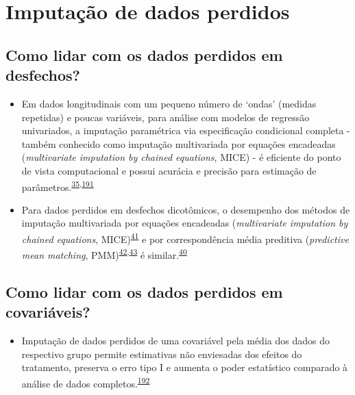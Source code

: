 \documentclass[
  a4paper,
]{book}
\providecommand{\tightlist}{%
  \setlength{\itemsep}{0pt}\setlength{\parskip}{0pt}}
\begin{document}
\hypertarget{imputacao-dados}{%
\section{Imputação de dados perdidos}\label{imputacao-dados}}

\hypertarget{como-lidar-com-os-dados-perdidos-em-desfechos}{%
\subsection{Como lidar com os dados perdidos em desfechos?}\label{como-lidar-com-os-dados-perdidos-em-desfechos}}

\begin{itemize}
\item
  Em dados longitudinais com um pequeno número de `ondas' (medidas repetidas) e poucas variáveis, para análise com modelos de regressão univariados, a imputação paramétrica via especificação condicional completa - também conhecido como imputação multivariada por equações encadeadas (\emph{multivariate imputation by chained equations}, MICE) - é eficiente do ponto de vista computacional e possui acurácia e precisão para estimação de parâmetros.\textsuperscript{\protect\hyperlink{ref-Heymans2022}{35},\protect\hyperlink{ref-Cao2022}{191}}
\item
  Para dados perdidos em desfechos dicotômicos, o desempenho dos métodos de imputação multivariada por equações encadeadas (\emph{multivariate imputation by chained equations}, MICE)\textsuperscript{\protect\hyperlink{ref-mice}{41}} e por correspondência média preditiva (\emph{predictive mean matching}, PMM)\textsuperscript{\protect\hyperlink{ref-rubin1986}{42},\protect\hyperlink{ref-little1988a}{43}} é similar.\textsuperscript{\protect\hyperlink{ref-austin2023}{40}}
\end{itemize}

\hypertarget{como-lidar-com-os-dados-perdidos-em-covariuxe1veis}{%
\subsection{Como lidar com os dados perdidos em covariáveis?}\label{como-lidar-com-os-dados-perdidos-em-covariuxe1veis}}

\begin{itemize}
\tightlist
\item
  Imputação de dados perdidos de uma covariável pela média dos dados do respectivo grupo permite estimativas não enviesadas dos efeitos do tratamento, preserva o erro tipo I e aumenta o poder estatístico comparado à análise de dados completos.\textsuperscript{\protect\hyperlink{ref-Kahan2014}{192}}
\end{itemize}
\end{document}
